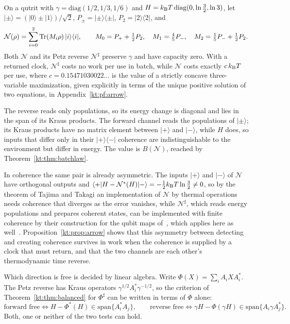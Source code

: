 \begin{proposition}\label{kt:prop:arrow}\leavevmode\\
On a qutrit with $\gamma=\mathrm{diag}(1/2,1/3,1/6)$ and $H=k_{\mathrm B} T\,\mathrm{diag}(0,\ln\tfrac32,\ln3)$, let $|\pm\rangle=(|0\rangle\pm|1\rangle)/\sqrt2$, $P_\pm=|\pm\rangle\langle\pm|$, $P_2=|2\rangle\langle2|$, and
\[
\mathcal N(\rho)=\sum_{i=0}^2\operatorname{Tr}(M_i\rho)\,|i\rangle\langle i|,\qquad M_0=P_++\tfrac12P_2,\quad M_1=\tfrac45P_-,\quad M_2=\tfrac15P_-+\tfrac12P_2.
\]
Both $\mathcal N$ and its Petz reverse $\mathcal N^\sharp$ preserve $\gamma$ and have capacity zero. With a returned clock, $\mathcal N^\sharp$ costs no work per use in batch, while $\mathcal N$ costs exactly $c\,k_{\mathrm B} T$ per use, where $c=0.15471030022\ldots$ is the value of a strictly concave three-variable maximization, given explicitly in terms of the unique positive solution of two equations, in Appendix~\ref{kt:pf:arrow}.
\end{proposition}

The reverse reads only populations, so its energy change is diagonal and lies in the span of its Kraus products. The forward channel reads the populations of $|\pm\rangle$; its Kraus products have no matrix element between $|+\rangle$ and $|-\rangle$, while $H$ does, so inputs that differ only in their $|+\rangle\langle-|$ coherence are indistinguishable to the environment but differ in energy. The value is $B(\mathcal N)$, reached by Theorem~\ref{kt:thm:batchlaw}.

In coherence the same pair is already asymmetric. The inputs $|+\rangle$ and $|-\rangle$ of $\mathcal N$ have orthogonal outputs and $\langle+|H-\mathcal N^*(H)|-\rangle=-\tfrac12k_{\mathrm B} T\ln\tfrac32\neq0$, so by the theorem of Tajima and Takagi an implementation of $\mathcal N$ by thermal operations needs coherence that diverges as the error vanishes, while $\mathcal N^\sharp$, which reads energy populations and prepares coherent states, can be implemented with finite coherence by their construction for the qubit maps of~\cite{FOR15}, which applies here as well~\cite[Suppl.\ Sec.~IV]{TajimaTakagi25}. Proposition~\ref{kt:prop:arrow} shows that this asymmetry between detecting and creating coherence survives in work when the coherence is supplied by a clock that must return, and that the two channels are each other's thermodynamic time reverse.

Which direction is free is decided by linear algebra. Write $\Phi(X)=\sum_iA_iXA_i^*$. The Petz reverse has Kraus operators $\gamma^{1/2}A_i^*\gamma^{-1/2}$, so the criterion of Theorem~\ref{kt:thm:balanced} for $\Phi^\sharp$ can be written in terms of $\Phi$ alone:
\[
\text{forward free}\iff H-\Phi^*(H)\in\mathrm{span}\{A_i^*A_j\},\qquad
\text{reverse free}\iff \gamma H-\Phi(\gamma H)\in\mathrm{span}\{A_i\gamma A_j^*\}.
\]
Both, one or neither of the two tests can hold.

